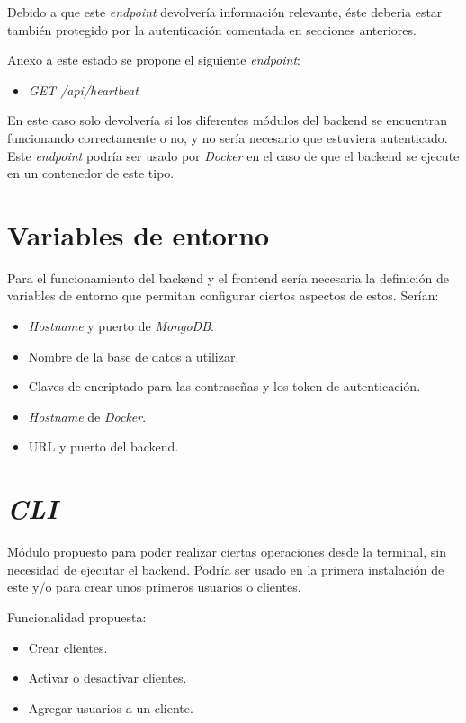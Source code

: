 \bigskip
Debido a que este \textit{endpoint} devolvería información relevante, éste deberia estar también protegido por la autenticación comentada en secciones anteriores.

\bigskip
Anexo a este estado se propone el siguiente \textit{endpoint}:
\begin{itemize}
	\item \textit{GET /api/heartbeat}
\end{itemize}


\bigskip
En este caso solo devolvería si los diferentes módulos del backend se encuentran funcionando correctamente o no, y no sería necesario que estuviera autenticado. Este \textit{endpoint} podría ser usado por \textit{Docker} en el caso de que el backend se ejecute en un contenedor de este tipo.



\section{Variables de entorno}


Para el funcionamiento del backend y el frontend sería necesaria la definición de variables de entorno que permitan configurar ciertos aspectos de estos. Serían:
\begin{itemize}
	\item \textit{Hostname} y puerto de \textit{MongoDB}.
	\item Nombre de la base de datos a utilizar.
	\item Claves de encriptado para las contraseñas y los token de autenticación.
	\item \textit{Hostname} de \textit{Docker}.
	\item URL y puerto del backend.
\end{itemize}





\section{\textit{CLI}}

Módulo propuesto para poder realizar ciertas operaciones desde la terminal, sin necesidad de ejecutar el backend. Podría ser usado en la primera instalación de este y/o para crear unos primeros usuarios o clientes.

\bigskip
Funcionalidad propuesta:
\begin{itemize}
	\item Crear clientes.
	\item Activar o desactivar clientes.
	\item Agregar usuarios a un cliente.
\end{itemize}




